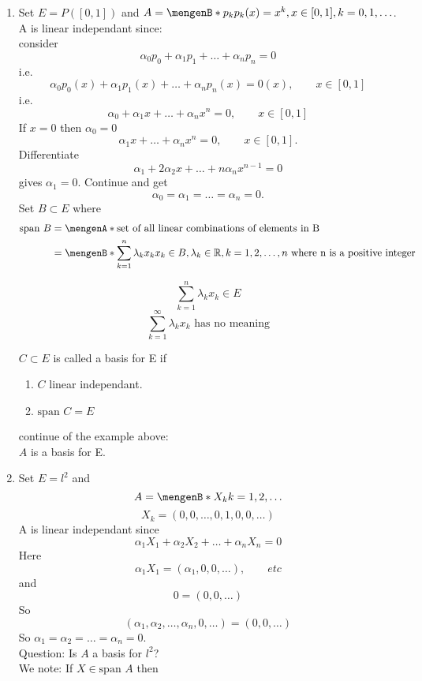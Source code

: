 	\begin{beispiele}
		\begin{enumerate}[(1)]
			\item 
		Set $E = P([0,1])$ and $A = \set[p_k]{p_k(x) = x^k, x \in [0,1], k= 0,1, \dots}$. A is linear independant since: \\ consider
		\[
			\alpha_0 p_0 + \alpha_1 p_1 + \dots + \alpha_np_n = 0
		\]
		i.e. 
		\[
			\alpha_0 p_0(x) + \alpha_1 p_1(x) + \dots + \alpha_n p_n(x) = 0(x), \qquad x \in [0,1] 
		\]
		i.e.
		\[
			\alpha_0 + \alpha_1 x + \dots + \alpha_n x^n = 0, \qquad x \in [0,1]
		\]
		If $x = 0$ then $\alpha_0 = 0$
		\[
			\alpha_1 x + \dots + \alpha_n x^n = 0, \qquad x \in [0,1].
		\]
		Differentiate
		\[
			\alpha_1 + 2 \alpha_2 x + \dots + n \alpha_n x^{n-1} = 0
		\]
		gives $\alpha_1 = 0$. Continue and get
		\[
			\alpha_0 = \alpha_1 = \dots = \alpha_n = 0.
		\]
		Set $B \subset E$ where
		\begin{align*}
			\text{span } B &= \set{\text{set of all linear combinations of elements in B}} \\
			&= \set[\sum_{k=1}^{n}\lambda_k x_k]{x_k \in B, \lambda_k \in \mathbb{R}, k=1,2,\dots,n \text{ where n is a positive integer}}
		\end{align*}
		\begin{bemerkung}
			\[
				\sum_{k=1}^{n}\lambda_k x_k \in E
			\]
			\[
				\sum_{k=1}^{\infty} \lambda_k x_k \text{    has no meaning}
			\]
		\end{bemerkung}
		$C \subset E$ is called a basis for E if
		\begin{enumerate}[1)]
			\item $C$ linear independant.
			\item $ \text{span } C = E$
		\end{enumerate}
		continue of the example above: \\
		$A$ is a basis for E.
		\item Set $E = l^2$ and
		\[
			A = \set[X_k]{k =1,2,\dots}
		\]
		\[
			X_k = (0,0,\dots,0,1,0,0,\dots)
		\]
		A is linear independant since
		\[
			\alpha_1 X_1 + \alpha_2 X_2 + \dots + \alpha_n X_n = 0
		\]
		Here 
		\[
			\alpha_1 X_1 = (\alpha_1,0,0,\dots), \qquad etc
		\]
		and
		\[
			0 = (0,0, \dots)
		\]
		So
		\[
			(\alpha_1,\alpha_2, \dots, \alpha_n,0, \dots) = (0,0,\dots)
		\]
		So $\alpha_1= \alpha_2 = \dots = \alpha_n = 0$. \\
		Question: Is $A$ a basis for $l^2$? \\
		We note: If $X \in \text{span }A$ then

\end{enumerate}
\end{beispiele}
